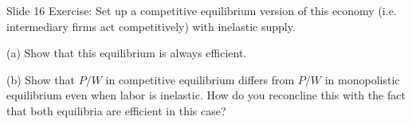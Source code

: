 Slide 16 Exercise: Set up a competitive equilibrium version of this economy (i.e. intermediary firms act competitively) with inelastic supply.

(a) Show that this equilibrium is always efficient.

(b) Show that $P / W$ in competitive equilibrium differs from $P / W$ in monopolistic equilibrium even when labor is inelastic. How do you reconcline this with the fact that both equilibria are efficient in this case?